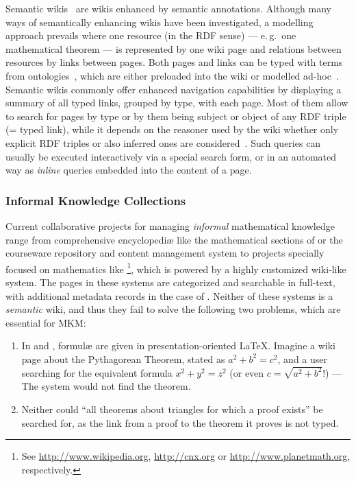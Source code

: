 \documentclass{llncs}
\begin{document}
Semantic wikis~\cite{semwiki06} are wikis enhanced by semantic annotations.  Although many
ways of semantically enhancing wikis have been investigated, a modelling approach prevails
where one resource (in the RDF sense) --- e.\,g.\ one mathematical theorem --- is
represented by one wiki page and relations between resources by links between pages.  Both
pages and links can be typed with terms from
ontologies~\cite{OrDeMoVoHa06:annotation-navigation-semwiki}, which are either preloaded
into the wiki or modelled ad-hoc~\cite{KrSchVr:semwiki-reasoning07}.  Semantic wikis
commonly offer enhanced navigation capabilities by displaying a summary of all typed
links, grouped by type, with each page.  Most of them allow to search for pages by type or
by them being subject or object of any RDF triple (= typed link), while it depends on the
reasoner used by the wiki whether only explicit RDF triples or also inferred ones are
considered~\cite{KrSchVr:semwiki-reasoning07}.  Such queries can usually be executed
interactively via a special search form, or in an automated way as \emph{inline} queries
embedded into the content of a page.

\subsubsection{Informal Knowledge Collections}
\label{sec:math-knowledge-collections}

Current collaborative projects for managing \emph{informal} mathematical knowledge range
from comprehensive encyclopediæ like the mathematical sections of  or
the courseware repository and content management system  to projects
specially focused on mathematics like \footnote{See
  \url{http://www.wikipedia.org}, \url{http://cnx.org} or \url{http://www.planetmath.org},
  respectively.}, which is powered by a highly customized wiki-like system.  The pages in
these systems are categorized and searchable in full-text, with additional metadata
records in the case of .  Neither of these systems is a
\emph{semantic} wiki, and thus they fail to solve the following two problems, which are
essential for MKM:

\begin{enumerate}
\item\label{item:formula-search-usecase} In  and ,
  formulæ are given in presentation-oriented {\LaTeX}.  Imagine a wiki page about the
  Pythagorean Theorem, stated as $a^2 + b^2 = c^2$, and a user searching for the
  equivalent formula $x^2 + y^2 = z^2$ (or even $c=\sqrt{a^2+b^2}$!) --- The system would
  not find the theorem.
\item Neither could ``all theorems about triangles for which a
  proof exists'' be searched for, as the link from a proof to the theorem it proves is not
  typed.
\end{enumerate}
\end{document}
